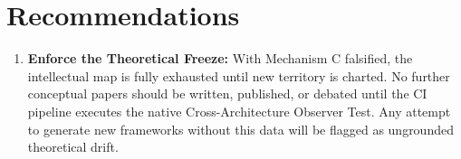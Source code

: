 \documentclass[11pt]{article}
\begin{document}
\section{Recommendations}
\begin{enumerate}
    \item \textbf{Enforce the Theoretical Freeze:} With Mechanism C falsified, the intellectual map is fully exhausted until new territory is charted. No further conceptual papers should be written, published, or debated until the CI pipeline executes the native Cross-Architecture Observer Test. Any attempt to generate new frameworks without this data will be flagged as ungrounded theoretical drift.
\end{enumerate}
\end{document}
